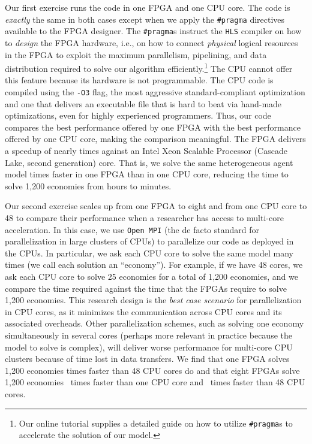 \documentclass[12pt,american]{article}
\makeatletter
\newcommand{\resultsfolder}{./results}
\newcommand{\devfpgaI}{fpgaI}
\newcommand{\devcpu}{cpu-cores}
\newcommand{\nKMIkI}{nKM4-nk100}
\newcommand{\cpucoreIII}{48}
\newcommand{\baselinespeedupFPGAICPUI}{\@\xspace}
\newcommand{\cpuItimehoursminutes}{ hours\@\xspace}
\newcommand{\fpgaItimehoursminutes}{ minutes\@\xspace}
\newcommand{\baselinespeedupFPGAIIICPUI}{}
\newcommand{\baselinespeedupFPGAIIICPUIII}{}
\newcommand{\fpgaspeedICPUIII}{}
\newcommand{\numbecon}{1,200\@\xspace}
\makeatother
\begin{document}
Our first exercise runs the code in one FPGA and one CPU core. The code is \textit{exactly} the same in both cases except when we apply the \texttt{\#pragma} directives available to the FPGA designer. The \texttt{\#pragma}s instruct the \texttt{HLS} compiler on how to \textit{design} the FPGA hardware, i.e., on how to connect \textit{physical} logical resources in the FPGA to exploit the maximum parallelism, pipelining, and data distribution required to solve our algorithm efficiently.\footnote{Our online tutorial
\citet{FPGAtutorial23} supplies a detailed guide on how to utilize \texttt{\#pragma}s to accelerate the solution of our model.} The CPU cannot offer this feature because its hardware is not programmable. The CPU code is compiled using the \texttt{-O3} flag, the most aggressive standard-compliant optimization and one that delivers an executable file that is hard to beat via hand-made optimizations, even for highly experienced programmers. Thus, our code compares the best performance offered by one FPGA with the best performance offered by one CPU core, making the comparison meaningful. The FPGA delivers a speedup of nearly \baselinespeedupFPGAICPUI\hspace{-0.2cm} times against an Intel Xeon Scalable Processor (Cascade Lake, second generation) core. That is, we solve the same heterogeneous agent model \baselinespeedupFPGAICPUI times faster in one FPGA than in one CPU core, reducing the time to solve 1,200 economies from \cpuItimehoursminutes to \fpgaItimehoursminutes.

Our second exercise scales up from one FPGA to eight and from one CPU core to 48 to compare their performance when a researcher has access to multi-core acceleration. In this case, we use \texttt{Open MPI} (the de facto standard for parallelization in large clusters of CPUs) to parallelize our code as deployed in the CPUs. In particular, we ask each CPU core to solve the same model many times (we call each solution an ``economy''). For example, if we have 48 cores, we ask each CPU core to solve 25 economies for a total of \numbecon economies, and we compare the time required against the time that the FPGAs require to solve \numbecon economies. This research design is the \textit{best case scenario} for parallelization in CPU cores, as it minimizes the communication across CPU cores and its associated overheads. Other parallelization schemes, such as solving one economy simultaneously in several cores (perhaps more relevant in practice because the model to solve is complex), will deliver worse performance for multi-core CPU clusters because of time lost in data transfers. We find that one FPGA solves \numbecon economies \fpgaspeedICPUIII times faster than 48 CPU cores do and that eight FPGAs solve \numbecon economies \baselinespeedupFPGAIIICPUI \ times faster than one CPU core and \baselinespeedupFPGAIIICPUIII \ times faster than 48 CPU cores.
\end{document}
